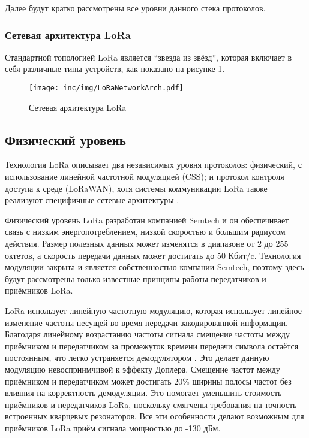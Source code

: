 Далее будут кратко рассмотрены все уровни данного стека протоколов.

\subsubsection{Сетевая архитектура LoRa}

Стандартной топологией LoRa является ``звезда из звёзд'', которая включает в себя различные типы устройств, как показано на рисунке \ref{fig:loranetworkarch}.

\begin{figure}[ht]
  \centering
  \texttt{[image: inc/img/LoRaNetworkArch.pdf]}
  \caption{Сетевая архитектура LoRa}
  \label{fig:loranetworkarch}
\end{figure}

\subsection{Физический уровень}

Технология LoRa описывает два независимых уровня протоколов: физический, с использование линейной частотной модуляцией (CSS); и протокол контроля доступа к среде (LoRaWAN), хотя системы коммуникации LoRa также реализуют специфичные сетевые архитектуры \cite{augustin2016}.

Физический уровень LoRa разработан компанией Semtech и он обеспечивает связь с низким энергопотреблением, низкой скоростью и большим радиусом действия.
Размер полезных данных может изменятся в диапазоне от 2 до 255 октетов, а скорость передачи данных может достигать до 50 Кбит/c. 
Технология модуляции закрыта и является собственностью компании Semtech, поэтому здесь будут рассмотрены только известные принципы работы передатчиков и приёмников LoRa.

LoRa использует линейную частотную модуляцию, которая использует линейное изменение частоты несущей во время передачи закодированной информации.
Благодаря линейному возрастанию частоты сигнала смещение частоты между приёмником и передатчиком за промежуток времени передачи символа остаётся постоянным, что легко устраняется демодулятором \cite{augustin2016}. 
Это делает данную модуляцию невосприимчивой к эффекту Доплера.
Смещение частот между приёмником и передатчиком может достигать 20\% ширины полосы частот без влияния на корректность демодуляции.
Это помогает уменьшить стоимость приёмников и передатчиков LoRa, поскольку смягчены требования на точность встроенных кварцевых резонаторов.
Все эти особенности делают возможным для приёмников LoRa приём сигнала мощностью 
до -130 дБм.

